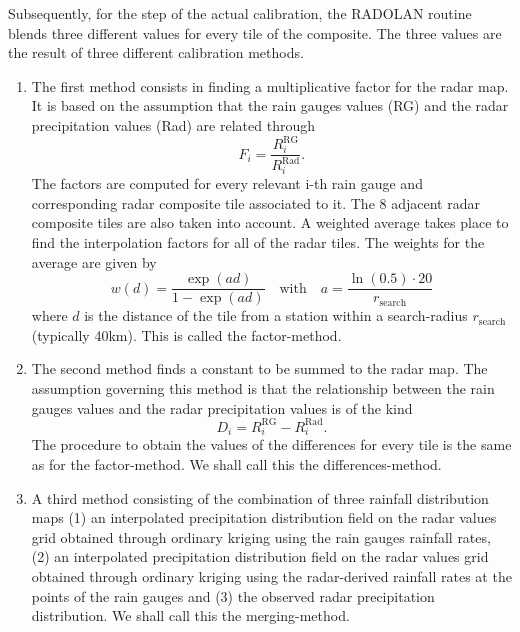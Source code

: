 Subsequently, for the step of the actual calibration, the RADOLAN routine blends three different values for every tile of the composite. The three values are the result of three different calibration methods. 
\begin{enumerate}
    \item The first method consists in finding a multiplicative factor for the radar map. It is based on the assumption that the rain gauges values (RG) and the radar precipitation values (Rad) are related through
    \begin{equation}
        F_{i} = \dfrac{R_i^{\text{RG}}}{R_i^{\text{Rad}}}.
    \end{equation}
    The factors are computed for every relevant i-th rain gauge and corresponding radar composite tile associated to it. The 8 adjacent radar composite tiles are also taken into account. A weighted average takes place to find the interpolation factors for all of the radar tiles. The weights for the average are given by 
    \begin{equation}
        w(d) = \dfrac{\exp({ad})}{1-\exp({ad})}\quad\text{with}\quad a=\dfrac{\ln(0.5)\cdot20}{r_{\text{search}}}
    \end{equation}
    where $d$ is the distance of the tile from a station within a search-radius $r_{\text{search}}$ (typically 40km). This is called the factor-method.
    \item The second method finds a constant to be summed to the radar map. The assumption governing this method is that the relationship between the rain gauges values and the radar precipitation values is of the kind
    \begin{equation}
        D_i = R_i^{\text{RG}} - R_i^{\text{Rad}}.
    \end{equation}
    The procedure to obtain the values of the differences for every tile is the same as for the factor-method. We shall call this the differences-method.
    \item  A third method consisting of the combination of three rainfall distribution maps (1) an interpolated precipitation distribution field on the radar values grid obtained through ordinary kriging using the rain gauges rainfall rates, (2) an interpolated precipitation distribution field on the radar values grid obtained through ordinary kriging using the radar-derived rainfall rates at the points of the rain gauges and (3) the observed radar precipitation distribution. We shall call this the merging-method.
\end{enumerate}
